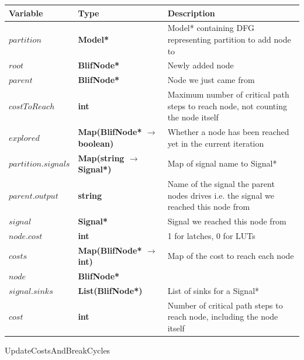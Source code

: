 \documentclass[12pt,final,oneside]{dwThesis} %
\begin{document}
   \begin{algorithm}
      \begin{center}
         \begin{tabularx}{\linewidth}{llX}
            \toprule
            Variable & Type & Description\\
            \midrule
            $partition$ &\textbf{  Model* } &  Model* containing DFG representing partition to add node to\\
            $root$ &\textbf{  BlifNode* } &  Newly added node\\
            $parent$ &\textbf{  BlifNode* } &  Node we just came from\\
            $costToReach$ &\textbf{  int } &  Maximum number of critical path steps to reach node, not counting the node itself \\
            $explored$ &\textbf{  Map(BlifNode* $\to$ boolean) } &  Whether a node has been reached yet in the current iteration \\ 
            $partition.signals$ &\textbf{  Map(string $\to$ Signal*) } &  Map of signal name to Signal* \\
            $parent.output$ &\textbf{ string } &  Name of the signal the parent nodes drives i.e. the signal we reached this node from\\
            $signal$ & \textbf{ Signal* } &  Signal we reached this node from\\
            $node.cost$ &\textbf{  int } &  1 for latches, 0 for LUTs \\
            $costs$ &\textbf{  Map(BlifNode* $\to$ int) } &  Map of the cost to reach each node \\
            $node$ &\textbf{  BlifNode* } &  \\
            $signal.sinks$ &\textbf{  List(BlifNode*) } &  List of sinks for a Signal* \\
            $cost$ &\textbf{  int } &  Number of critical path steps to reach node, including the node itself \\
            \bottomrule
         \end{tabularx}
      \end{center}
      \caption{UpdateCostsAndBreakCycles}\label{updatecosts}
      \begin{algorithmic}[1]
          

\end{algorithmic}
\end{algorithm}
\end{document}
